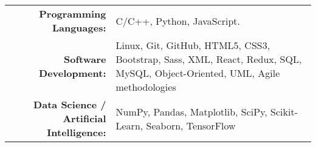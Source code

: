 \renewcommand{\arraystretch}{1.1}

	\begin{tabular}{>{}r>{}p{13cm}} 
		\textbf{Programming Languages:} &   C/C++, Python, JavaScript.\\
		\textbf{Software Development:} 	&   Linux, Git, GitHub, HTML5, CSS3, Bootstrap, Sass, XML, React, Redux, SQL, MySQL,
Object-Oriented, UML, Agile methodologies\\
		\textbf{Data Science / Artificial Intelligence:}
		                                &   NumPy, Pandas, Matplotlib, SciPy, Scikit-Learn, Seaborn, TensorFlow
	\end{tabular}